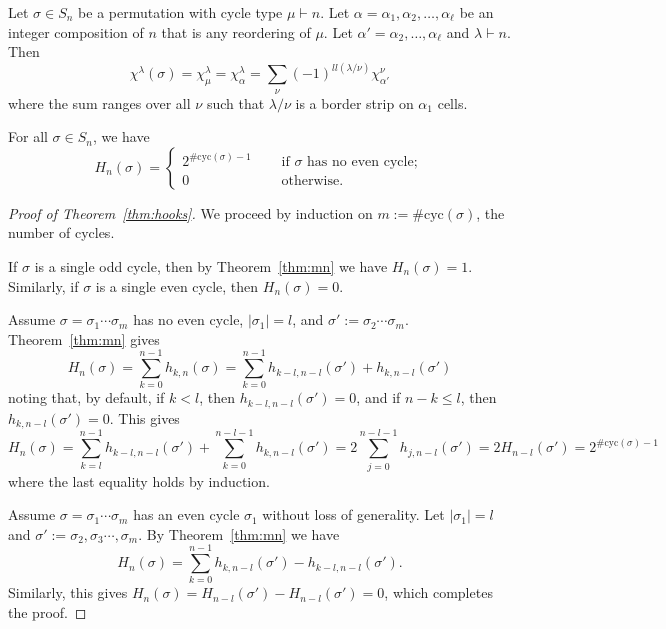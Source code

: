 \documentclass[10pt,a4paper]{amsart}
\begin{document}
\begin{theorem}\label{thm:mn} Let $\sigma \in S_n$ be a permutation with cycle type $\mu \vdash n$. Let $\alpha = \alpha_1,\alpha_2, \ldots, \alpha_\ell$ be an integer composition of $n$ that is any reordering of $\mu$. Let $\alpha' = \alpha_2, \ldots, \alpha_\ell$ and $\lambda \vdash n$. Then 
$$
	\chi^{\lambda}(\sigma) = \chi^{\lambda}_\mu = \chi^{\lambda}_\alpha = \sum_{\nu} (-1)^{ll(\lambda /\nu)} \chi^{\nu}_{\alpha'}
$$
where the sum ranges over all $\nu$ such that $\lambda / \nu$ is a border strip on $\alpha_1$ cells.
\end{theorem}

\begin{theorem}\label{thm:hooks} For all $\sigma \in S_n$, we have
	$$
		H_n (\sigma) = 
		\begin{cases}
		2^{\#\mathrm{cyc}(\sigma) - 1} \quad& \text{ if } \sigma \text{ has no even cycle};\\
		0 \quad& \text{ otherwise.}
		\end{cases} 
	$$
\end{theorem}

\begin{proof}[Proof of Theorem~\ref{thm:hooks}]
We proceed by induction on $m := \#\mathrm{cyc}(\sigma)$, the number of cycles.

If $\sigma$ is a single odd cycle, then by Theorem~\ref{thm:mn} we have $H_n(\sigma) = 1$. Similarly, if $\sigma$ is a single even cycle, then $H_n(\sigma) =0$.

\medskip
\noindent Assume $\sigma = \sigma_1\cdots\sigma_m$ has no even cycle, $|\sigma_1| = l$, and $\sigma' := \sigma_2\cdots\sigma_m$. Theorem~\ref{thm:mn} gives
	\[
		H_n(\sigma) = \sum_{k=0}^{n-1} h_{k,n}(\sigma)  = \sum_{k=0}^{n-1} h_{k-l,n-l}(\sigma') + h_{k,n-l}(\sigma')  
	\]
	noting that, by default, if $k < l$, then $h_{k-l,n-l}(\sigma') = 0$, and if $n-k \leq l$, then $h_{k,n-l}(\sigma') = 0$. This gives
	\[
		H_n(\sigma)  = \sum_{k=l}^{n-1} h_{k-l,n-l}(\sigma') + \!\!  \sum_{k=0}^{n-l-1} h_{k,n-l}(\sigma')  
 = 2 \sum_{j=0}^{n-l-1} h_{j,n-l}(\sigma') = 2H_{n-l}(\sigma') = 2^{\#\text{cyc}(\sigma) - 1}
	\]
	where the last equality holds by induction.
	
	
\medskip
	
\noindent Assume $\sigma = \sigma_1 \cdots \sigma_m$ has an even cycle $\sigma_1$ without loss of generality. Let $|\sigma_1| = l$ and $\sigma' := \sigma_2,\sigma_3 \cdots, \sigma_m$. By Theorem~\ref{thm:mn} we have
	\[
		H_n(\sigma) = \sum_{k=0}^{n-1}  h_{k,n-l}(\sigma') - h_{k-l,n-l}(\sigma').
	\]
Similarly, this gives $H_n(\sigma) = H_{n-l}(\sigma') - H_{n-l}(\sigma') = 0$, which completes the proof.
\end{proof}
\end{document}
